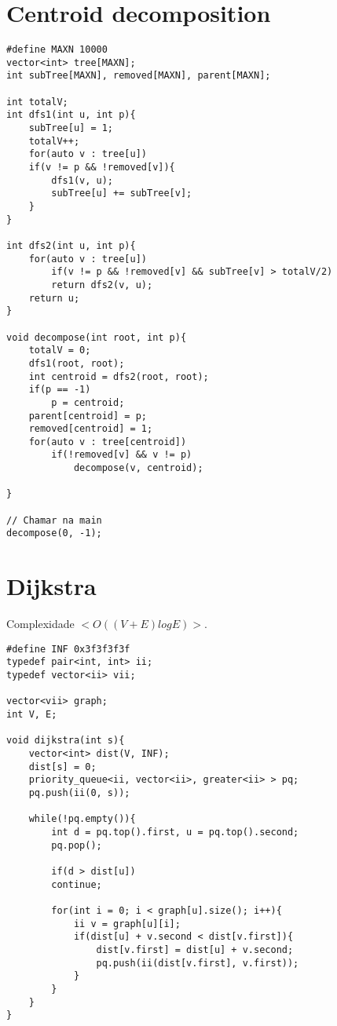 \section{Centroid decomposition}

\begin{multicols}{2}
	\begin{lstlisting}
#define MAXN 10000
vector<int> tree[MAXN];
int subTree[MAXN], removed[MAXN], parent[MAXN];

int totalV;
int dfs1(int u, int p){
	subTree[u] = 1;
	totalV++;
	for(auto v : tree[u])
	if(v != p && !removed[v]){
		dfs1(v, u);
		subTree[u] += subTree[v];
	}
}

int dfs2(int u, int p){
	for(auto v : tree[u])
		if(v != p && !removed[v] && subTree[v] > totalV/2)
		return dfs2(v, u);
	return u;
}

void decompose(int root, int p){
	totalV = 0;
	dfs1(root, root);
	int centroid = dfs2(root, root);
	if(p == -1)
		p = centroid;
	parent[centroid] = p;
	removed[centroid] = 1;
	for(auto v : tree[centroid])
		if(!removed[v] && v != p)
			decompose(v, centroid);
	
}

// Chamar na main
decompose(0, -1);
\end{lstlisting}
\end{multicols}

\section{Dijkstra}
Complexidade $<O((V + E)log E)>$.
\begin{multicols}{2}
	\begin{lstlisting}
#define INF 0x3f3f3f3f
typedef pair<int, int> ii;
typedef vector<ii> vii;

vector<vii> graph;
int V, E; 

void dijkstra(int s){
	vector<int> dist(V, INF); 
	dist[s] = 0;
	priority_queue<ii, vector<ii>, greater<ii> > pq;
	pq.push(ii(0, s));
	
	while(!pq.empty()){
		int d = pq.top().first, u = pq.top().second;
		pq.pop();
		
		if(d > dist[u])
		continue;
		
		for(int i = 0; i < graph[u].size(); i++){
			ii v = graph[u][i];
			if(dist[u] + v.second < dist[v.first]){
				dist[v.first] = dist[u] + v.second;
				pq.push(ii(dist[v.first], v.first));
			}
		}
	}
}	
	\end{lstlisting}
\end{multicols}